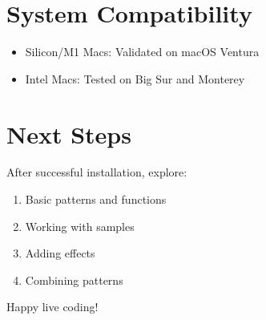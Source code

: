 \documentclass[11pt,a4paper]{article}
\begin{document}
\section{System Compatibility}

\begin{itemize}
    \item Silicon/M1 Macs: Validated on macOS Ventura
    \item Intel Macs: Tested on Big Sur and Monterey
\end{itemize}

\section{Next Steps}

After successful installation, explore:
\begin{enumerate}
    \item Basic patterns and functions
    \item Working with samples
    \item Adding effects
    \item Combining patterns
\end{enumerate}

Happy live coding!
\end{document}

